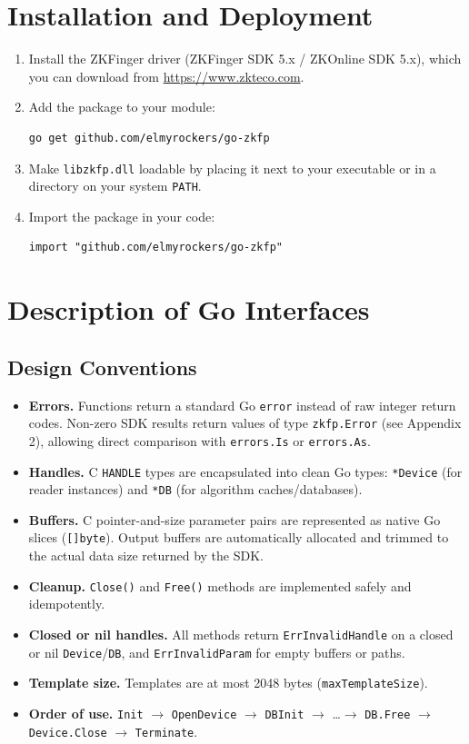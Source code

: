 \documentclass[11pt, a4paper]{article}
\begin{document}
\section{Installation and Deployment}
\begin{enumerate}
    \item Install the ZKFinger driver (ZKFinger SDK 5.x / ZKOnline SDK 5.x), which you can download from \url{https://www.zkteco.com}.
    \item Add the package to your module:
\begin{lstlisting}
go get github.com/elmyrockers/go-zkfp
\end{lstlisting}
    \item Make \texttt{libzkfp.dll} loadable by placing it next to your executable or in a directory on your system \texttt{PATH}.
    \item Import the package in your code:
\begin{lstlisting}
import "github.com/elmyrockers/go-zkfp"
\end{lstlisting}
\end{enumerate}

\section{Description of Go Interfaces}

\subsection{Design Conventions}
\begin{itemize}
    \item \textbf{Errors.} Functions return a standard Go \texttt{error} instead of raw integer return codes. Non-zero SDK results return values of type \texttt{zkfp.Error} (see Appendix 2), allowing direct comparison with \texttt{errors.Is} or \texttt{errors.As}.
    \item \textbf{Handles.} C \texttt{HANDLE} types are encapsulated into clean Go types: \texttt{*Device} (for reader instances) and \texttt{*DB} (for algorithm caches/databases).
    \item \textbf{Buffers.} C pointer-and-size parameter pairs are represented as native Go slices (\texttt{[]byte}). Output buffers are automatically allocated and trimmed to the actual data size returned by the SDK.
    \item \textbf{Cleanup.} \texttt{Close()} and \texttt{Free()} methods are implemented safely and idempotently.
    \item \textbf{Closed or nil handles.} All methods return \texttt{ErrInvalidHandle} on a closed or nil \texttt{Device}/\texttt{DB}, and \texttt{ErrInvalidParam} for empty buffers or paths.
    \item \textbf{Template size.} Templates are at most 2048 bytes (\texttt{maxTemplateSize}).
    \item \textbf{Order of use.} \texttt{Init} $\rightarrow$ \texttt{OpenDevice} $\rightarrow$ \texttt{DBInit} $\rightarrow$ \ldots $\rightarrow$ \texttt{DB.Free} $\rightarrow$ \texttt{Device.Close} $\rightarrow$ \texttt{Terminate}.
\end{itemize}
\end{document}

